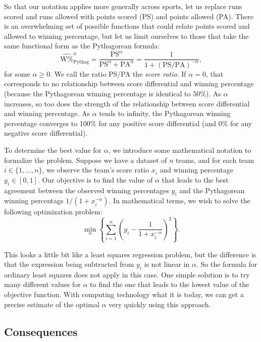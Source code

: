 \documentclass{article}
\begin{document}
So that our notation applies more generally across sports, let us replace runs scored and runs allowed with points scored (PS) and points allowed (PA). There is an overwhelming set of possible functions that could relate points scored and allowed to winning percentage, but let us limit ourselves to those that take the same functional form as the Pythagorean formula:
$$
  \hat{\mbox{W\%}}_{\mbox{Pythag}}^\alpha = \frac{\mbox{PS}^\alpha}{\mbox{PS}^\alpha + \mbox{PA}^\alpha} = \frac{1}{1 + (\mbox{PS/PA})^{-\alpha}},
$$
for some $\alpha \ge 0$. We call the ratio PS/PA the {\it score ratio}. If $\alpha = 0$, that corresponds to no relationship between score differential and winning percentage (because the Pythagorean winning percentage is identical to 50\%). As $\alpha$ increases, so too does the strength of the relationship between score differential and winning percentage. As $\alpha$ tends to infinity, the Pythagorean winning percentage converges to 100\% for any positive score differential (and 0\% for any negative score differential).

To determine the best value for $\alpha$, we introduce some mathematical notation to formalize the problem. Suppose we have a dataset of $n$ teams, and for each team $i \in \{1, ..., n\}$, we observe the team's score ratio $x_i$ and winning percentage $y_i \in [0, 1]$. Our objective is to find the value of $\alpha$ that leads to the best agreement between the observed winning percentages $y_i$ and the Pythagorean winning percentags $1 / (1 + x_i^{-\alpha})$. In mathematical terms, we wish to solve the following optimization problem:
\begin{equation*}
  \min_\alpha \left\{\sum_{i = 1}^n \left(y_i - \frac{1}{1 + x_i^{-\alpha}}\right)^2 \right\}.
\end{equation*}

This looks a little bit like a least squares regression problem, but the difference is that the expression being subtracted from $y_i$ is not linear in $\alpha$. So the formula for ordinary least squares does not apply in this case. One simple solution is to try many different values for $\alpha$ to find the one that leads to the lowest value of the objective function. With computing technology what it is today, we can get a precise estimate of the optimal $\alpha$ very quickly using this approach.

\subsection{\sc Consequences}
\end{document}

